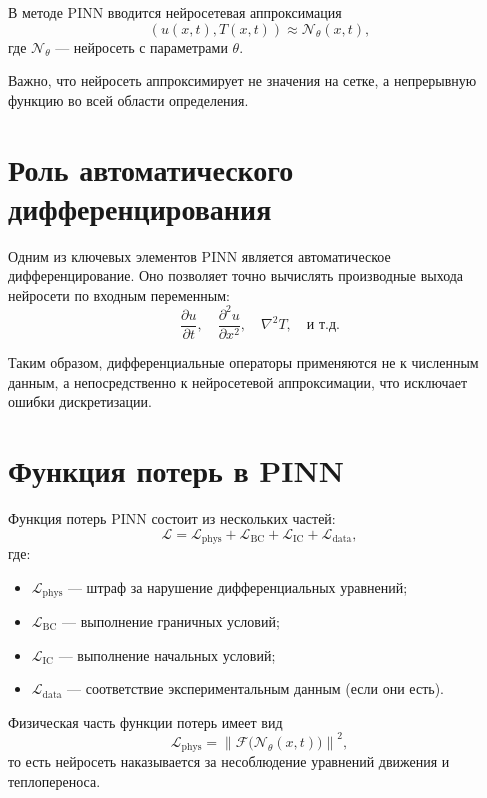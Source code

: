 \documentclass[12pt]{article}
\begin{document}
В методе PINN вводится нейросетевая аппроксимация
\begin{equation}
(u(x,t), T(x,t)) \approx \mathcal{N}_\theta(x,t),
\end{equation}
где $\mathcal{N}_\theta$ — нейросеть с параметрами $\theta$.

Важно, что нейросеть аппроксимирует не значения на сетке, а непрерывную функцию во всей области определения.

\section{Роль автоматического дифференцирования}

Одним из ключевых элементов PINN является автоматическое дифференцирование. Оно позволяет точно вычислять производные выхода нейросети по входным переменным:
\begin{equation}
\frac{\partial u}{\partial t}, \quad
\frac{\partial^2 u}{\partial x^2}, \quad
\nabla^2 T, \quad \text{и т.д.}
\end{equation}

Таким образом, дифференциальные операторы применяются не к численным данным, а непосредственно к нейросетевой аппроксимации, что исключает ошибки дискретизации.

\section{Функция потерь в PINN}

Функция потерь PINN состоит из нескольких частей:
\begin{equation}
\mathcal{L} =
\mathcal{L}_{\text{phys}} +
\mathcal{L}_{\text{BC}} +
\mathcal{L}_{\text{IC}} +
\mathcal{L}_{\text{data}},
\end{equation}
где:
\begin{itemize}
    \item $\mathcal{L}_{\text{phys}}$ — штраф за нарушение дифференциальных уравнений;
    \item $\mathcal{L}_{\text{BC}}$ — выполнение граничных условий;
    \item $\mathcal{L}_{\text{IC}}$ — выполнение начальных условий;
    \item $\mathcal{L}_{\text{data}}$ — соответствие экспериментальным данным (если они есть).
\end{itemize}

Физическая часть функции потерь имеет вид
\begin{equation}
\mathcal{L}_{\text{phys}} =
\left\| \mathcal{F}\bigl(\mathcal{N}_\theta(x,t)\bigr) \right\|^2,
\end{equation}
то есть нейросеть наказывается за несоблюдение уравнений движения и теплопереноса.
\end{document}

